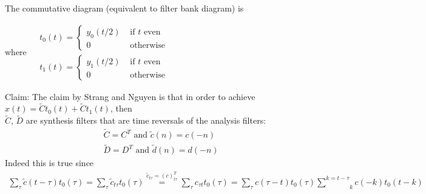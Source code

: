 \documentclass[twoside]{amsart}
\theoremstyle{plain}
\theoremstyle{definition}
\theoremstyle{remark}
\numberwithin{equation}{section}
\begin{document}
The commutative diagram (equivalent to filter bank diagram) is


where $\begin{aligned} & t_0(t) = \begin{cases} y_0(t/2) & \text{ if $t$ even } \\
    0 & \text{ otherwise} \end{cases} \\ 
& t_1(t) = \begin{cases} y_1(t/2) & \text{ if $t$ even } \\
    0 & \text{ otherwise} \end{cases} \end{aligned}$

Claim: The claim by Strang and Nguyen\cite{GStrangTNguyen1996} is that in order to achieve $x(t) = \widetilde{C}t_0(t) + \widetilde{C}t_1(t)$, then \\
$\widetilde{C}$, $\widetilde{D}$ are synthesis filters that are time reversals of the analysis filters:
\begin{equation}\label{Eq:Orthogonal_timereversal}
\begin{aligned}
  & \widetilde{C} = C^T \text{ and } \widetilde{c}(n) = c(-n) \\ 
  &  \widetilde{D} = D^T \text{ and } \widetilde{d}(n)=  d(-n)
\end{aligned}
\end{equation}
Indeed this is true since
\[
\begin{gathered}
  \sum_{\tau} \widetilde{c}(t-\tau)t_0(\tau) = \sum_{\tau} \widetilde{c}_{t\tau} t_0(\tau) \overset{\widetilde{c}_{t\tau} = (c)^T_{t\tau} }{=} \sum_{\tau} c_{\tau t} t_0(\tau) = \sum_{\tau} c(\tau-t) t_0(\tau) \overset{k=t-\tau} \sum_k c(-k) t_0(t-k)\
\end{gathered}
\]
\end{document}
